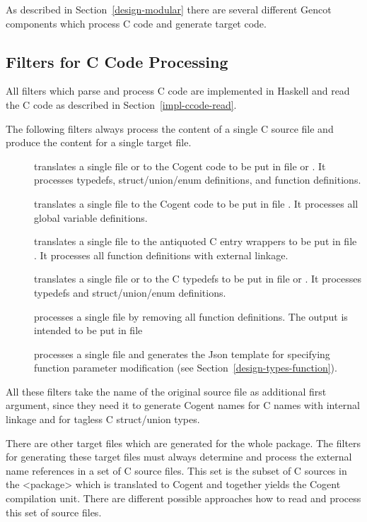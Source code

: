 As described in Section~\ref{design-modular} there are several different Gencot components which process C code and generate 
target code.

\subsection{Filters for C Code Processing}
\label{impl-comps-filters}

All filters which parse and process C code are implemented in Haskell and read the
C code as described in Section~\ref{impl-ccode-read}.

The following filters always process the content of a single C source file and produce the content for a single 
target file.
\begin{description}
\item[] translates a single file  or  to the Cogent code to be put in file
 or . It processes typedefs, struct/union/enum definitions, and function
definitions. 
\item[] translates a single file  to the Cogent code to be put in file .
It processes all global variable definitions.
\item[] translates a single file  to the antiquoted C entry wrappers to be put in
file . It processes all function definitions with external linkage.
\item[] translates a single file  or  to the C typedefs to be put in
file  or . It processes typedefs and struct/union/enum definitions.
\item[] processes a single file  by removing all function definitions. The output
is intended to be put in file 
\item[] processes a single file  and generates the Json template for specifying
function parameter modification (see Section~\ref{design-types-function}).
\end{description}

All these filters take the name of the original source file as additional first
argument, since they need it to generate Cogent names for C names with internal linkage and for tagless C struct/union
types.

There are other target files which are generated for the whole package. The filters for generating these target files 
must always determine and process the external name references in a set of
C source files. This set is the subset of C sources in the <package> which is translated to Cogent and together yields
the Cogent compilation unit. There are different possible approaches how to read and process this set of source files.

